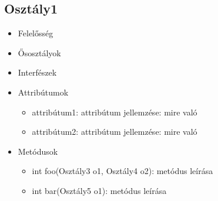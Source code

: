 \subsection{Osztály1}
\begin{itemize}
\item Felelősség\\
\item Ősosztályok\\
\item Interfészek\\
\item Attribútumok\\
	\begin{itemize}
		\item attribútum1: attribútum jellemzése: mire való
		\item attribútum2: attribútum jellemzése: mire való
	\end{itemize}
\item Metódusok\\
	\begin{itemize}
		\item int foo(Osztály3 o1, Osztály4 o2): metódus leírása
		\item int bar(Osztály5 o1): metódus leírása
	\end{itemize}
\end{itemize}

